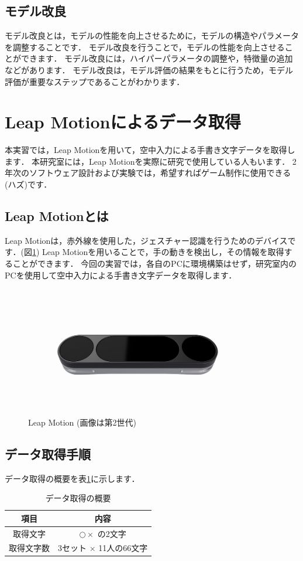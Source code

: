 \documentclass{jarticle}
\begin{document}
\subsection{モデル改良}
モデル改良とは，モデルの性能を向上させるために，モデルの構造やパラメータを調整することです．
モデル改良を行うことで，モデルの性能を向上させることができます．
モデル改良には，ハイパーパラメータの調整や，特徴量の追加などがあります．
モデル改良は，モデル評価の結果をもとに行うため，モデル評価が重要なステップであることがわかります．

\section{Leap Motionによるデータ取得}
本実習では，Leap Motionを用いて，空中入力による手書き文字データを取得します．
本研究室には，Leap Motionを実際に研究で使用している人もいます．
2年次のソフトウェア設計および実験では，希望すればゲーム制作に使用できる(ハズ)です．

\subsection{Leap Motionとは}
Leap Motionは，赤外線を使用した，ジェスチャー認識を行うためのデバイスです．(図\ref{fig:leapmotion})
Leap Motionを用いることで，手の動きを検出し，その情報を取得することができます．
今回の実習では，各自のPCに環境構築はせず，研究室内のPCを使用して空中入力による手書き文字データを取得します．

\begin{figure}[H]
  \centering
  \includegraphics[width=10cm]{fig/leapmotion.png}
  \caption{Leap Motion \cite{leapmotion} (画像は第2世代)}
  \label{fig:leapmotion}
\end{figure}

\subsection{データ取得手順}
データ取得の概要を表\ref{table:data_acquisition}に示します．
\begin{table}[H]
  \centering
  \caption{データ取得の概要}
  \begin{tabular}[H]{c|c } \hline
    \label{table:data_acquisition}
    項目 & 内容 \\ \hline
    取得文字 & $ \bigcirc  \times $ の2文字\\
    取得文字数 & 3セット $ \times $ 11人の66文字 \\ \hline
  \end{tabular}
\end{table}
\end{document}
